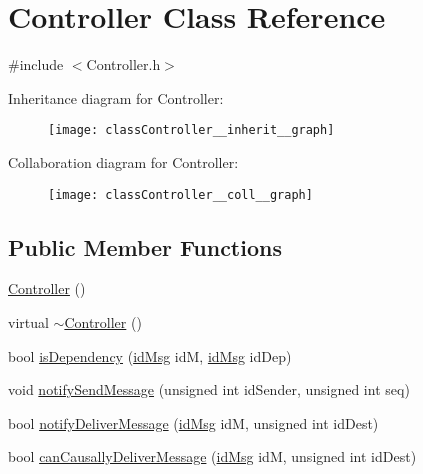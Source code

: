 \hypertarget{classController}{}\section{Controller Class Reference}
\label{classController}


{\ttfamily \#include $<$Controller.\+h$>$}



Inheritance diagram for Controller\+:\nopagebreak
\begin{figure}[H]
\begin{center}
\leavevmode
\texttt{[image: classController\_\_inherit\_\_graph]}
\end{center}
\end{figure}


Collaboration diagram for Controller\+:\nopagebreak
\begin{figure}[H]
\begin{center}
\leavevmode
\texttt{[image: classController\_\_coll\_\_graph]}
\end{center}
\end{figure}
\subsection*{Public Member Functions}
\begin{DoxyCompactItemize}
\item 
\hyperlink{classController_a95c56822d667e94b031451729ce069a9}{Controller} ()
\item 
virtual \hyperlink{classController_a0ab87934c4f7a266cfdb86e0f36bc1b5}{$\sim$\+Controller} ()
\item 
bool \hyperlink{classController_ad76a99df69bf99705dc18ba72b4b04c2}{is\+Dependency} (\hyperlink{structures_8h_a83a1d9a070efa5341da84cfd8e28d3e5}{id\+Msg} idM, \hyperlink{structures_8h_a83a1d9a070efa5341da84cfd8e28d3e5}{id\+Msg} id\+Dep)
\item 
void \hyperlink{classController_a7207304a07534e50a690f26c765b4a71}{notify\+Send\+Message} (unsigned int id\+Sender, unsigned int seq)
\item 
bool \hyperlink{classController_a8905abf1976e737410ac0142001e38a0}{notify\+Deliver\+Message} (\hyperlink{structures_8h_a83a1d9a070efa5341da84cfd8e28d3e5}{id\+Msg} idM, unsigned int id\+Dest)
\item 
bool \hyperlink{classController_ab57c4459f002be63b4deda1d7c3c3e29}{can\+Causally\+Deliver\+Message} (\hyperlink{structures_8h_a83a1d9a070efa5341da84cfd8e28d3e5}{id\+Msg} idM, unsigned int id\+Dest)
\end{DoxyCompactItemize}

